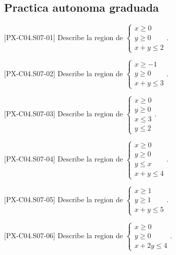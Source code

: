 \subsection*{Practica autonoma graduada}
\begin{exercise}{[PX-C04.S07-01] Describe la region de \(\begin{cases}x\geq 0\\ y\geq 0\\ x+y\leq 2\end{cases}\).}
\end{exercise}
\begin{exercise}{[PX-C04.S07-02] Describe la region de \(\begin{cases}x\geq -1\\ y\geq 0\\ x+y\leq 3\end{cases}\).}
\end{exercise}
\begin{exercise}{[PX-C04.S07-03] Describe la region de \(\begin{cases}x\geq 0\\ y\geq 0\\ x\leq 3\\ y\leq 2\end{cases}\).}
\end{exercise}
\begin{exercise}{[PX-C04.S07-04] Describe la region de \(\begin{cases}x\geq 0\\ y\geq 0\\ y\leq x\\ x+y\leq 4\end{cases}\).}
\end{exercise}
\begin{exercise}{[PX-C04.S07-05] Describe la region de \(\begin{cases}x\geq 1\\ y\geq 1\\ x+y\leq 5\end{cases}\).}
\end{exercise}
\begin{exercise}{[PX-C04.S07-06] Describe la region de \(\begin{cases}x\geq 0\\ y\geq 0\\ x+2y\leq 4\end{cases}\).}
\end{exercise}

